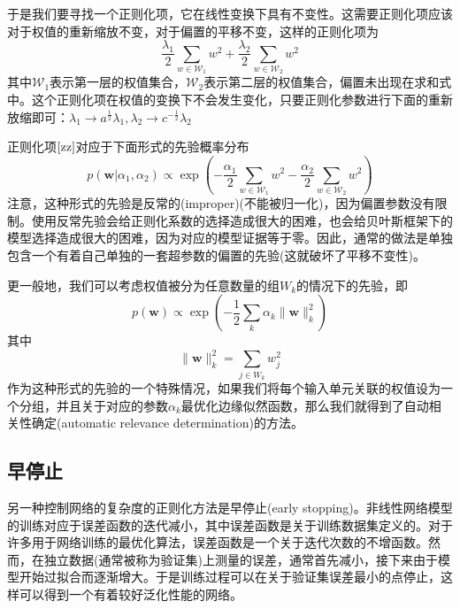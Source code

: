 于是我们要寻找一个正则化项，它在线性变换下具有不变性。这需要正则化项应该对于权值的重新缩放不变，对于偏置的平移不变，这样的正则化项为
\begin{equation}
\label{zz}
	\frac{\lambda_1}{2}\sum_{w\in \mathcal{W}_1}w^2+\frac{\lambda_2}{2}\sum_{w\in \mathcal{W}_2}w^2
\end{equation}
其中$\mathcal{W}_1$表示第一层的权值集合，$\mathcal{W}_2$表示第二层的权值集合，偏置未出现在求和式中。这个正则化项在权值的变换下不会发生变化，只要正则化参数进行下面的重新放缩即可：$\lambda_1 \rightarrow a^{\frac{1}{2}}\lambda_1,\lambda_2\to c^{-\frac{1}{2}}\lambda_2$

正则化项$\ref{zz}$对应于下面形式的先验概率分布
\begin{equation}
	p(\boldsymbol{w}|\alpha_1,\alpha_2)\propto \exp\left(-\frac{\alpha_1}{2}\sum_{w\in \mathcal{W}_1}w^2-\frac{\alpha_2}{2}\sum_{w\in \mathcal{W}_2}w^2 \right)
\end{equation}
注意，这种形式的先验是反常的(improper)(不能被归一化)，因为偏置参数没有限制。使用反常先验会给正则化系数的选择造成很大的困难，也会给贝叶斯框架下的模型选择造成很大的困难，因为对应的模型证据等于零。因此，通常的做法是单独包含一个有着自己单独的一套超参数的偏置的先验(这就破坏了平移不变性)。

更一般地，我们可以考虑权值被分为任意数量的组$W_k$的情况下的先验，即
\begin{equation}
	p(\boldsymbol{w})\propto \exp \left(-\frac{1}{2}\sum_k \alpha_k\lVert \boldsymbol{w}\rVert_k^2 \right)
\end{equation}
其中
\begin{equation}
	\lVert \boldsymbol{w}\rVert_k^2=\sum_{j\in W_k}w_j^2
\end{equation}
作为这种形式的先验的一个特殊情况，如果我们将每个输入单元关联的权值设为一个分组，并且关于对应的参数$\alpha_k$最优化边缘似然函数，那么我们就得到了自动相关性确定(automatic relevance determination)的方法。
\subsection*{早停止}
另一种控制网络的复杂度的正则化方法是早停止(early stopping)。非线性网络模型的训练对应于误差函数的迭代减小，其中误差函数是关于训练数据集定义的。对于许多用于网络训练的最优化算法，误差函数是一个关于迭代次数的不增函数。然而，在独立数据(通常被称为验证集)上测量的误差，通常首先减小，接下来由于模型开始过拟合而逐渐增大。于是训练过程可以在关于验证集误差最小的点停止，这样可以得到一个有着较好泛化性能的网络。
